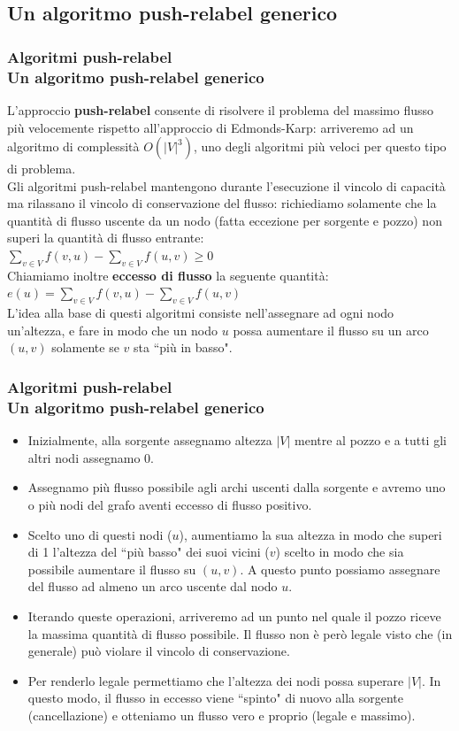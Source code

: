 \documentclass{beamer}
\begin{document}
\subsection{Un algoritmo push-relabel generico}

\begin{frame}
\frametitle{Algoritmi push-relabel\\Un algoritmo push-relabel generico}
L'approccio \textbf{push-relabel} consente di risolvere il problema del massimo flusso più velocemente rispetto all'approccio di Edmonds-Karp: arriveremo ad un algoritmo di complessità $O(|V|^3)$, uno degli algoritmi più veloci per questo tipo di problema.\\
Gli algoritmi push-relabel mantengono durante l'esecuzione il vincolo di capacità ma rilassano il vincolo di conservazione del flusso: richiediamo solamente che la quantità di flusso uscente da un nodo (fatta eccezione per sorgente e pozzo) non superi la quantità di flusso entrante:\\
$\sum\limits_{v\in V}f(v,u)-\sum\limits_{v\in V}f(u,v)\geq 0$\\
Chiamiamo inoltre \textbf{eccesso di flusso} la seguente quantità:\\
$e(u)=\sum\limits_{v\in V}f(v,u)-\sum\limits_{v\in V}f(u,v)$\\
L'idea alla base di questi algoritmi consiste nell'assegnare ad ogni nodo un'altezza, e fare in modo che un nodo $u$ possa aumentare il flusso su un arco $(u,v)$ solamente se $v$ sta ``più in basso".
\end{frame}

\begin{frame}
\frametitle{Algoritmi push-relabel\\Un algoritmo push-relabel generico}
\begin{itemize}
\item Inizialmente, alla sorgente assegnamo altezza $|V|$ mentre al pozzo e a tutti gli altri nodi assegnamo 0.
\item Assegnamo più flusso possibile agli archi uscenti dalla sorgente e avremo uno o più nodi del grafo aventi eccesso di flusso positivo.
\item Scelto uno di questi nodi ($u$), aumentiamo la sua altezza in modo che superi di 1 l'altezza del ``più basso" dei suoi vicini ($v$) scelto in modo che sia possibile aumentare il flusso su $(u,v)$. A questo punto possiamo assegnare del flusso ad almeno un arco uscente dal nodo $u$.
\item Iterando queste operazioni, arriveremo ad un punto nel quale il pozzo riceve la massima quantità di flusso possibile. Il flusso non è però legale visto che (in generale) può violare il vincolo di conservazione.
\item Per renderlo legale permettiamo che l'altezza dei nodi possa superare $|V|$. In questo modo, il flusso in eccesso viene ``spinto" di nuovo alla sorgente (cancellazione) e otteniamo un flusso vero e proprio (legale e massimo).
\end{itemize}
\end{frame}
\end{document}
